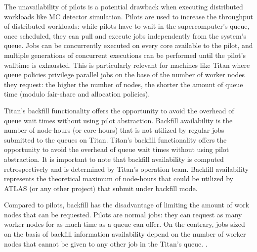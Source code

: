 The unavailability of pilots is a potential drawback when executing distributed
workloads like MC detector simulation. Pilots are used to increase the
throughput of distributed workloads: while pilots have to wait in the
supercomputer's queue, once scheduled, they can pull and execute jobs
independently from the system's queue. Jobs can be concurrently executed on
every core available to the pilot, and multiple generations of concurrent
executions can be performed until the pilot's walltime is exhausted. This is
particularly relevant for machines like Titan where queue policies privilege
parallel jobs on the base of the number of worker nodes they request: the higher
the number of nodes, the shorter the amount of queue time (modulo fair-share and
allocation policies).



Titan’s backfill functionality offers the opportunity to avoid the overhead of
queue wait times without using pilot abstraction. Backfill availability is the
number of node-hours (or core-hours) that  is not utilized by regular jobs
submitted to the queues on Titan. Titan’s backfill functionality offers the
opportunity to avoid the overhead of queue wait times without using pilot
abstraction.  It is important to note that backfill availability is  computed
retrospectively and is determined by Titan's operation team. Backfill
availability represents the theoretical maximum of node-hours that could be
utilized by ATLAS (or any other project) that submit under backfill mode.

Compared to pilots, backfill has the disadvantage of limiting the amount of
work nodes that can be requested. Pilots are normal jobs: they can request as
many worker nodes for as much time as a queue can offer. On the contrary, jobs
sized on the basis of backfill information availability depend on the number
of worker nodes that cannot be given to any other job in the Titan's queue. %
.

